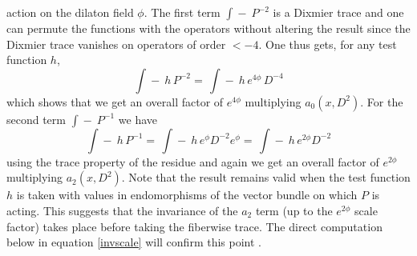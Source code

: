 \documentclass[12pt]{article}%
\begin{document}
action on the dilaton field $\phi$. The first term $\int\!\!\!\!\!\!-\ P^{-2}$
is a Dixmier trace and one can permute the functions with the operators
without altering the result since the Dixmier trace vanishes on operators of
order $<-4$. One thus gets, for any test function $h$,
\[
\int\!\!\!\!\!\!-\ h\,P^{-2}=\,\int\!\!\!\!\!\!-\ h\,e^{4\phi}\,D^{-4}%
\]
which shows that we get an overall factor of $e^{4\phi}$ multiplying
$a_{0}\left(  x,D^{2}\right)  $. For the second term $\int
\!\!\!\!\!\!-\ P^{-1}$ we have
\[
\int\!\!\!\!\!\!-\ h\,P^{-1}=\,\int\!\!\!\!\!\!-\ h\,e^{\phi}D^{-2}e^{\phi
}=\,\int\!\!\!\!\!\!-\ h\,e^{2\phi}D^{-2}%
\]
using the trace property of the residue and again we get an overall factor of
$e^{2\phi}$ multiplying $a_{2}\left(  x,D^{2}\right)  $. Note that the result
remains valid when the test function $h$ is taken with values in endomorphisms
of the vector bundle on which $P$ is acting. This suggests that the invariance
of the $a_{2}$ term (up to the $e^{2\phi}$ scale factor) takes place before
taking the fiberwise trace. The direct computation below in equation
\eqref{invscale} will confirm this point .
\end{document}
